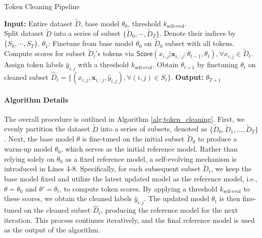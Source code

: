 \begin{algorithm}[h]
\caption{Token Cleaning Pipeline}\label{alg:token_cleaning} 
\begin{algorithmic}[1]
\STATE \textbf{Input:} Entire dataset $\widetilde{D}$, base model $\theta_0$, threshold $k_{\text{self-evol}}.$ \\
\STATE Split dataset $\widetilde{D}$ into a series of subset $\{\widetilde{D}_0, \cdots, \widetilde{D}_T \}$. Denote their indices by $\{S_0, \cdots, S_T\}$.
\STATE {} $\theta_1$: Finetune from base model $\theta_0$ on $\widetilde{D}_0$ subset with all tokens.
\STATE Compute scores for subset $\widetilde{D}_t$'s tokens via $\textsf{Score}(x_{i,j}|\bm x_{i, :j}; \theta_{t-1}, \theta_{t}), \forall x_{i,j} \in \widetilde{D}_t$.
\STATE  Assign token labels $\hat{y}_{i,j}$ with a threshold $k_{\text{self-evol}}$.
\STATE Obtain $\theta_{t+1}$ by finetuning $\theta_{t}$ on cleaned subset $\widehat{D}_t=\{(x_{i,j}, \bm x_{i,:j}, \hat y_{i,j}), \forall (i,j)\in S_t\}$.
\ENDFOR
\STATE \textbf{Output:} $\theta_{T+1}$
\end{algorithmic}
\end{algorithm}

\paragraph{Algorithm Details}
The overall procedure is outlined in Algorithm \ref{alg:token_cleaning}.
First, we evenly partition the dataset $\widetilde{D}$ into a series of subsets, denoted as $\{\widetilde{D}_{0}, \widetilde{D}_{1}, \dots, \widetilde{D}_{T}\}$.
Next, the base model $\theta$ is fine-tuned on the initial subset $\widetilde{D}_0$ to produce a warm-up model $\theta_0$, which serves as the initial reference model.
Rather than relying solely on $\theta_0$ as a fixed reference model, a self-evolving mechanism is introduced in Lines 4-8.
Specifically, for each subsequent subset $\widetilde{D}_t$, we keep the base model fixed and utilize the latest updated model as the reference model, i.e., $\theta = \theta_0$ and $\theta' = \theta_t$, to compute token scores.
By applying a threshold $k_{\text{self-evol}}$ to these scores, we obtain the cleaned labels $\hat y_{i,j}$.
The updated model $\theta_t$ is then fine-tuned on the cleaned subset $\widehat{D}_t$, producing the reference model for the next iteration.
This process continues iteratively, and the final reference model is used as the output of the algorithm.





